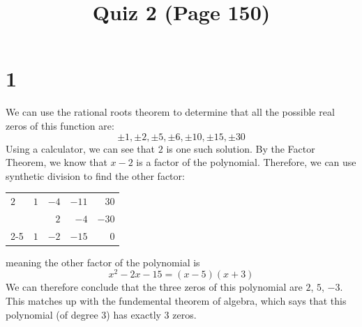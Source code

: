 \documentclass{article}
\title{Quiz 2 (Page 150)}
\theoremstyle{definition}
\begin{document}
\maketitle

\section*{1}
We can use the rational roots theorem to determine that all the possible real zeros of this function are:
\[ \pm 1,\pm 2,\pm 5, \pm 6, \pm 10, \pm 15, \pm 30 \]
Using a calculator, we can see that $2$ is one such solution. By the Factor Theorem, we know that $x-2$ is a factor of the polynomial. 
Therefore, we can use synthetic division to find the other factor:
\begin{center}
\begin{tabular}{l|rrrr}
	$2$ & $1$ & $-4$ & $-11$ & $30$ \\
	& & $2$ & $-4$ & $-30$ \\
	\cmidrule{2-5}
	& $1$ & $-2$ & $-15$ & $0$
\end{tabular}
\end{center}
meaning the other factor of the polynomial is \[ x^2-2x-15=(x-5)(x+3) \] We can therefore conclude that the three zeros of this polynomial are 
$2$, $5$, $-3$. This matches up with the fundemental theorem of algebra, which says that this polynomial (of degree 3) has exactly 3 zeros.
\end{document}
